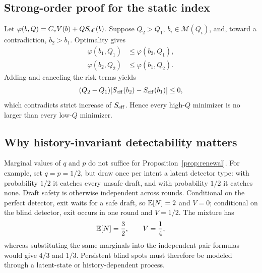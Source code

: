 \subsection{Strong-order proof for the static index}

Let
\(\varphi(b,Q)=C_vV(b)+Q S_{\rm eff}(b)\).  Suppose
\(Q_2>Q_1\), \(b_i\in\mathcal M(Q_i)\), and, toward a contradiction,
\(b_2>b_1\).  Optimality gives
\begin{align*}
 \varphi(b_1,Q_1)&\leq\varphi(b_2,Q_1),\\
 \varphi(b_2,Q_2)&\leq\varphi(b_1,Q_2).
\end{align*}
Adding and canceling the risk terms yields
\[
 (Q_2-Q_1)
 [S_{\rm eff}(b_2)-S_{\rm eff}(b_1)]\leq0,
\]
which contradicts strict increase of \(S_{\rm eff}\).  Hence every high-\(Q\)
minimizer is no larger than every low-\(Q\) minimizer.

\subsection{Why history-invariant detectability matters}
\label{app:persistence}

Marginal values of \(q\) and \(p\) do not suffice for
Proposition~\ref{prop:renewal}.  For example, set \(q=p=1/2\), but draw once
per intent a latent detector type: with probability \(1/2\) it catches every
unsafe draft, and with probability \(1/2\) it catches none.  Draft safety is
otherwise independent across rounds.  Conditional on the perfect detector,
exit waits for a safe draft, so \(\mathbb{E}[N]=2\) and \(V=0\); conditional on the
blind detector, exit occurs in one round and \(V=1/2\).  The mixture has
\[
 \mathbb{E}[N]=\frac32,\qquad V=\frac14,
\]
whereas substituting the same marginals into the independent-pair formulas
would give \(4/3\) and \(1/3\).  Persistent blind spots must therefore be
modeled through a latent-state or history-dependent process.
